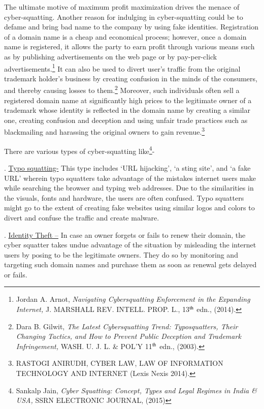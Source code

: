 \begin{multicols}{2}
\vspace{-.1cm}
\noi
The ultimate motive of maximum profit maximization drives the menace of cyber-squatting.
Another reason for indulging in cyber-squatting could be to defame and bring bad name to
the company by using fake identities. Registration of a domain name is a cheap and
economical process; however, once a domain name is registered, it allows the party to earn
profit through various means such as by publishing advertisements on the web page or by
pay-per-click advertisements.\footnote{Jordan A. Arnot, \textit{Navigating Cybersquatting Enforcement in the Expanding Internet,} J. MARSHALL REV. INTELL. PROP. L., 13$^{\rm th}$ edn., (2014).} It can also be used to divert user’s traffic from the original
trademark holder’s business by creating confusion in the minds of the consumers, and thereby
causing losses to them.\footnote{Dara B. Gilwit, \textit{The Latest Cybersquatting Trend: Typosquatters, Their Changing Tactics, and How to Prevent Public Deception and Trademark Infringement,} WASH. U. J. L. \& POL’Y 11$^{\rm th}$ edn., (2003).} Moreover, such individuals often sell a registered domain name at
significantly high prices to the legitimate owner of a trademark whose identity is reflected in the domain name by creating a similar one, creating confusion and deception and using unfair
trade practices such as blackmailing and harassing the original owners to gain revenue.\footnote{RASTOGI ANIRUDH, CYBER LAW, LAW OF INFORMATION TECHNOLOGY AND INTERNET (Lexis Nexis 2014).}

\vspace{-.1cm}
\noi
There are various types of cyber-squatting like\footnote{Sankalp Jain, \textit{Cyber Squatting: Concept, Types and Legal Regimes in India \& USA,} SSRN ELECTRONIC JOURNAL, (2015)}-

\vspace{-.1cm}

. \underline{Typo squatting-} This type includes ‘URL hijacking’, ‘a sting site’, and ‘a fake URL’
wherein typo squatters take advantage of the mistakes internet users make while searching
the browser and typing web addresses. Due to the similarities in the visuals, fonts and
hardware, the users are often confused. Typo squatters might go to the extent of creating fake
websites using similar logos and colors to divert and confuse the traffic and create malware.

\vspace{-.1cm}

. \underline{Identity Theft –} In case an owner forgets or fails to renew their domain, the cyber squatter
takes undue advantage of the situation by misleading the internet users by posing to be the
legitimate owners. They do so by monitoring and targeting such domain names and purchase
them as soon as renewal gets delayed or fails.


\end{multicols}
